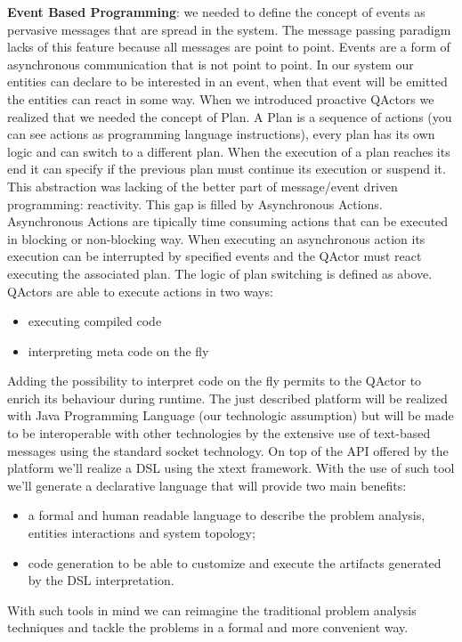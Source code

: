 \textbf{Event Based Programming}: we needed to define the concept of events as pervasive messages that are spread in the system. The message passing paradigm
lacks of this feature because all messages are point to point. Events are a form
of asynchronous communication that is not point to point. In our system our
entities can declare to be interested in an event, when that event will be emitted
the entities can react in some way.
When we introduced proactive QActors we realized that we needed the concept
of Plan. A Plan is a sequence of actions (you can see actions as programming
language instructions), every plan has its own logic and can switch to a different
plan. When the execution of a plan reaches its end it can specify if the
previous plan must continue its execution or suspend it. This abstraction was
lacking of the better part of message/event driven programming: reactivity. This
gap is filled by Asynchronous Actions. Asynchronous Actions are tipically time
consuming actions that can be executed in blocking or non-blocking way. When
executing an asynchronous action its execution can be interrupted by specified
events and the QActor must react executing the associated plan. The logic of
plan switching is defined as above. QActors are able to execute actions in two
ways:
\begin{itemize}
	\item executing compiled code
	\item interpreting meta code on the fly
\end{itemize} 
Adding the possibility to interpret code on the fly permits to the QActor to enrich
its behaviour during runtime. The just described platform will be realized with
Java Programming Language (our technologic assumption) but will be made
to be interoperable with other technologies by the extensive use of text-based
messages using the standard socket technology.
On top of the API offered by the platform we’ll realize a DSL using the xtext
framework. With the use of such tool we’ll generate a declarative language that
will provide two main benefits:
\begin{itemize}
	\item a formal and human readable language to describe the problem analysis,
	entities interactions and system topology;
	\item code generation to be able to customize and execute the artifacts generated by the DSL interpretation.
\end{itemize}
With such tools in mind we can reimagine the traditional problem analysis
techniques and tackle the problems in a formal and more convenient way.